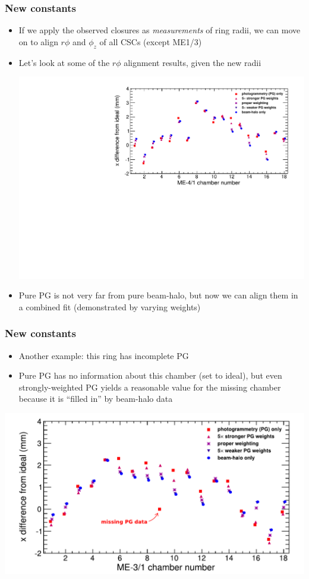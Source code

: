 \documentclass[compress]{beamer}
\begin{document}
\begin{frame}
\frametitle{New constants}

\begin{itemize}
\item If we apply the observed closures as {\it measurements} of ring
  radii, we can move on to align $r\phi$ and $\phi_z$ of all CSCs
  (except ME1/3)

\item Let's look at some of the $r\phi$ alignment results, given the new radii

\includegraphics[width=\linewidth]{dependence_on_weights_41.pdf}

\item Pure PG is not very far from pure beam-halo, but now we can
  align them in a combined fit (demonstrated by varying weights)
\end{itemize}
\end{frame}

\begin{frame}
\frametitle{New constants}

\begin{itemize}
\item Another example: this ring has incomplete PG
\item Pure PG has no information about this chamber (set to ideal),
  but even strongly-weighted PG yields a reasonable value for the missing
  chamber because it is ``filled in'' by beam-halo data
\end{itemize}

\includegraphics[width=\linewidth]{dependence_on_weights_31.pdf}
\end{frame}
\end{document}
